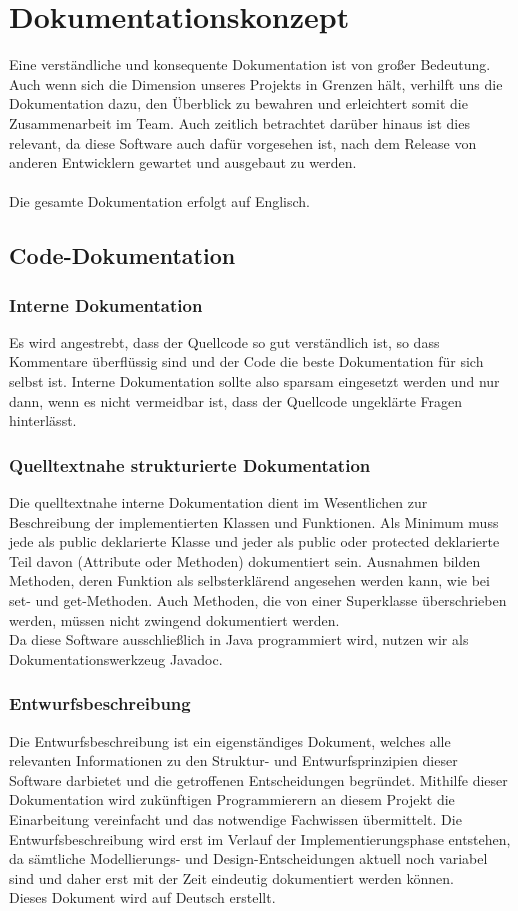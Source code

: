 \chapter{Dokumentationskonzept}
Eine verständliche und konsequente Dokumentation ist von großer Bedeutung. Auch wenn sich die Dimension unseres Projekts in Grenzen hält, verhilft uns die Dokumentation dazu, den Überblick zu bewahren und erleichtert somit die Zusammenarbeit im Team. Auch zeitlich betrachtet darüber hinaus ist dies relevant, da diese Software auch dafür vorgesehen ist, nach dem Release von anderen Entwicklern gewartet und ausgebaut zu werden. \\
\\Die gesamte Dokumentation erfolgt auf Englisch.

\section{Code-Dokumentation}

\subsection{Interne Dokumentation}
Es wird angestrebt, dass der Quellcode so gut verständlich ist, so dass Kommentare überflüssig sind und der Code die beste Dokumentation für sich selbst ist. Interne Dokumentation sollte also sparsam eingesetzt werden und nur dann, wenn es nicht vermeidbar ist, dass der Quellcode ungeklärte Fragen hinterlässt.

\subsection{Quelltextnahe strukturierte Dokumentation}
Die quelltextnahe interne Dokumentation dient im Wesentlichen zur Beschreibung der implementierten Klassen und Funktionen. Als Minimum muss jede als public deklarierte Klasse und jeder als public oder protected deklarierte Teil davon (Attribute oder Methoden) dokumentiert sein. Ausnahmen bilden Methoden, deren Funktion als selbsterklärend angesehen werden kann, wie bei set- und get-Methoden. Auch Methoden, die von einer Superklasse überschrieben werden, müssen nicht zwingend dokumentiert werden.
\\Da diese Software ausschließlich in Java programmiert wird, nutzen wir als Dokumentationswerkzeug Javadoc.

\subsection{Entwurfsbeschreibung}
Die Entwurfsbeschreibung ist ein eigenständiges Dokument, welches alle relevanten Informationen zu den Struktur- und Entwurfsprinzipien dieser Software darbietet und die getroffenen Entscheidungen begründet. Mithilfe dieser Dokumentation wird zukünftigen Programmierern an diesem Projekt die Einarbeitung vereinfacht und das notwendige Fachwissen übermittelt. Die Entwurfsbeschreibung wird erst im Verlauf der Implementierungsphase entstehen, da sämtliche Modellierungs- und Design-Entscheidungen aktuell noch variabel sind und daher erst mit der Zeit eindeutig dokumentiert werden können.
\\Dieses Dokument wird auf Deutsch erstellt.

